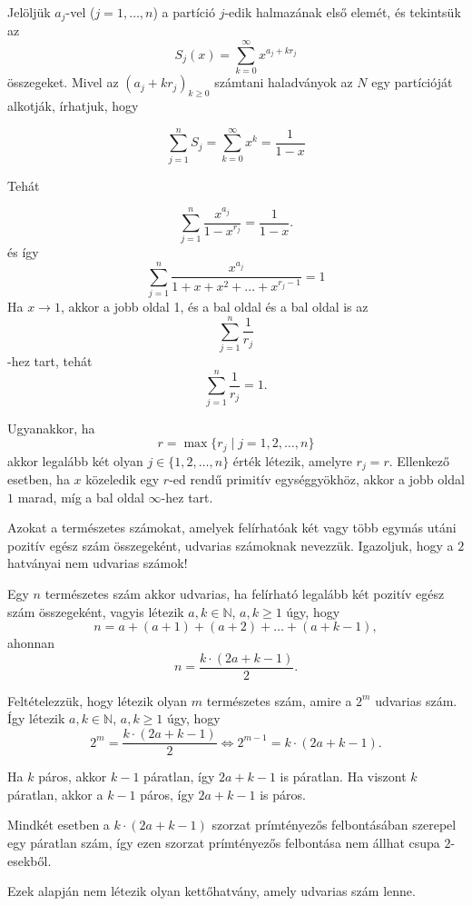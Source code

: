 \begin{solution}
Jelöljük $a_{j}$-vel ($j=1,\dots,n$) a partíció $j$-edik halmazának
első elemét, és tekintsük az
\[
S_{j}(x)=\sum_{k=0}^{\infty}x^{a_{j}+kr_{j}}
\]
összegeket. Mivel az $(a_{j}+kr_{j})_{k\geq0}$ számtani haladványok
az $N$ egy partícióját alkotják, írhatjuk, hogy

\[
\sum_{j=1}^{n}S_{j}=\sum_{k=0}^{\infty}x^{k}=\frac{1}{1-x}
\]

Tehát

\[
\sum_{j=1}^{n}\frac{x^{a_{j}}}{1-x^{r_{j}}}=\frac{1}{1-x}.
\]
és így 
\[
\sum_{j=1}^{n}\frac{x^{a_{j}}}{1+x+x^{2}+...+x^{r_{j}-1}}=1
\]
Ha $x\to1$, akkor a jobb oldal 1, és a bal oldal és a bal oldal is
az 
\[
\sum_{j=1}^{n}\frac{1}{r_{j}}
\]
-hez tart, tehát 
\[
\sum_{j=1}^{n}\frac{1}{r_{j}}=1.
\]

Ugyanakkor, ha 
\[
r=\max\{r_{j}\mid j=1,2,\dots,n\}
\]
akkor legalább két olyan $j\in\{1,2,\dots,n\}$ érték létezik, amelyre
$r_{j}=r$. Ellenkező esetben, ha $x$ közeledik egy $r$-ed rendű
primitív egységgyökhöz, akkor a jobb oldal $1$ marad, míg a bal oldal
$\infty$-hez tart.
\end{solution}
\begin{extraproblem}
Azokat a természetes számokat, amelyek felírhatóak két vagy több
egymás utáni pozitív egész szám összegeként, udvarias számoknak nevezzük.
Igazoljuk, hogy a $2$ hatványai nem udvarias számok! 
\end{extraproblem}
\begin{solution}
Egy $n$ természetes szám akkor udvarias, ha felírható legalább két
pozitív egész szám összegeként, vagyis létezik $a,k\in\mathbb{N}$,
$a,k\geq1$ úgy, hogy 
\[
n=a+(a+1)+(a+2)+\ldots+(a+k-1),
\]
ahonnan 
\[
n=\dfrac{k\cdot(2a+k-1)}{2}.
\]

Feltételezzük, hogy létezik olyan $m$ természetes szám, amire a $2^{m}$
udvarias szám. Így létezik $a,k\in\mathbb{N}$, $a,k\geq1$ úgy, hogy
\[
2^{m}=\dfrac{k\cdot(2a+k-1)}{2}\Leftrightarrow2^{m-1}=k\cdot(2a+k-1).
\]

Ha $k$ páros, akkor $k-1$ páratlan, így $2a+k-1$ is páratlan. Ha
viszont $k$ páratlan, akkor a $k-1$ páros, így $2a+k-1$ is páros.

Mindkét esetben a $k\cdot(2a+k-1)$ szorzat prímtényezős felbontásában
szerepel egy páratlan szám, így ezen szorzat prímtényezős felbontása
nem állhat csupa $2$-esekből.

Ezek alapján nem létezik olyan kettőhatvány, amely udvarias szám lenne. 
\end{solution}
